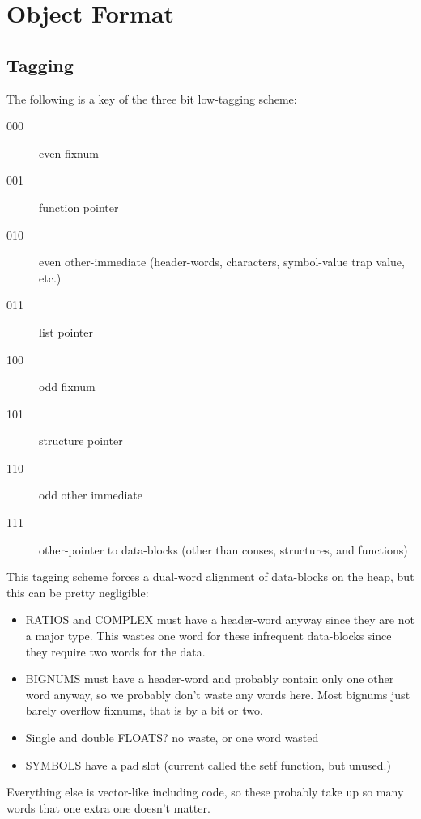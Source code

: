 \chapter{Object Format}


\section{Tagging}

The following is a key of the three bit low-tagging scheme:
\begin{description}
   \item[000] even fixnum
   \item[001] function pointer
   \item[010] even other-immediate (header-words, characters, symbol-value trap value, etc.)
   \item[011] list pointer
   \item[100] odd fixnum
   \item[101] structure pointer
   \item[110] odd other immediate
  \item[111] other-pointer to data-blocks (other than conses, structures,
                                     and functions)
\end{description}

This tagging scheme forces a dual-word alignment of data-blocks on the heap,
but this can be pretty negligible: 
\begin{itemize}
\item   RATIOS and COMPLEX must have a header-word anyway since they are not a
      major type.  This wastes one word for these infrequent data-blocks since
      they require two words for the data.

\item BIGNUMS must have a header-word and probably contain only one other word
      anyway, so we probably don't waste any words here.  Most bignums just
      barely overflow fixnums, that is by a bit or two.

\item   Single and double FLOATS?
      no waste, or
      one word wasted

\item   SYMBOLS have a pad slot (current called the setf function, but unused.)
\end{itemize}
Everything else is vector-like including code, so these probably take up
so many words that one extra one doesn't matter.


